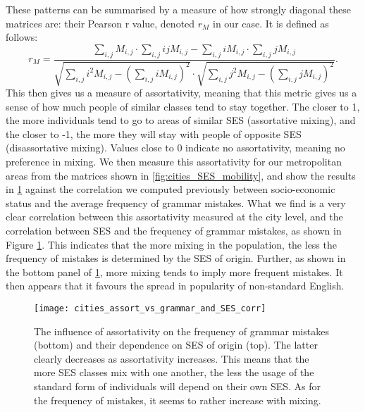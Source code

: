 \documentclass[../thesis.tex]{subfiles}
\begin{document}
These patterns can be summarised by a measure of how strongly diagonal these matrices
are: their Pearson r value, denoted $r_M$ in our case. It is defined as follows:
\begin{equation}
  r_M = \frac{
      \sum_{i, j} M_{i, j} \cdot \sum_{i, j} i j M_{i, j}
      - \sum_{i, j} i M_{i, j} \cdot \sum_{i, j} j M_{i, j}
    }{
      \sqrt{\sum_{i, j} i^2 M_{i, j} - \left( \sum_{i, j} i M_{i, j} \right)^2}
      \cdot \sqrt{\sum_{i, j} j^2 M_{i, j} - \left( \sum_{i, j} j M_{i, j} \right)^2}
    }.
\end{equation}
This then gives us a measure of assortativity, meaning that this metric gives us a sense
of how much people of similar classes tend to stay together. The closer to 1, the more
individuals tend to go to areas of similar \ac{SES} (assortative mixing), and the closer
to -1, the more they will stay with people of opposite \ac{SES} (disassortative mixing).
Values close to 0 indicate no assortativity, meaning no preference in mixing. We then
measure this assortativity for our metropolitan areas from the matrices shown in
\cref{fig:cities_SES_mobility}, and show the results in
\cref{fig:cities_assort_vs_grammar_and_SES_corr} against the correlation we computed
previously between socio-economic status and the average frequency of grammar mistakes.
What we find is a very clear correlation between this assortativity measured at the city
level, and the correlation between SES and the frequency of grammar mistakes, as shown
in Figure \cref{fig:cities_assort_vs_grammar_and_SES_corr}. This indicates that the more
mixing in the population, the less the frequency of mistakes is determined by the SES of
origin. Further, as shown in the bottom panel of
\cref{fig:cities_assort_vs_grammar_and_SES_corr}, more mixing tends to imply more
frequent mistakes. It then appears that it favours the spread in popularity of
non-standard English.
\begin{figure}
\centering
  \texttt{[image: cities\_assort\_vs\_grammar\_and\_SES\_corr]}
  \caption{The influence of assortativity on the frequency of grammar mistakes (bottom)
  and their dependence on \ac{SES} of origin (top). The latter clearly decreases as
  assortativity increases. This means that the more \ac{SES} classes mix with one
  another, the less the usage of the standard form of individuals will depend on their
  own \ac{SES}. As for the frequency of mistakes, it seems to rather increase with
  mixing.}
  \label{fig:cities_assort_vs_grammar_and_SES_corr}
\end{figure}
\end{document}
